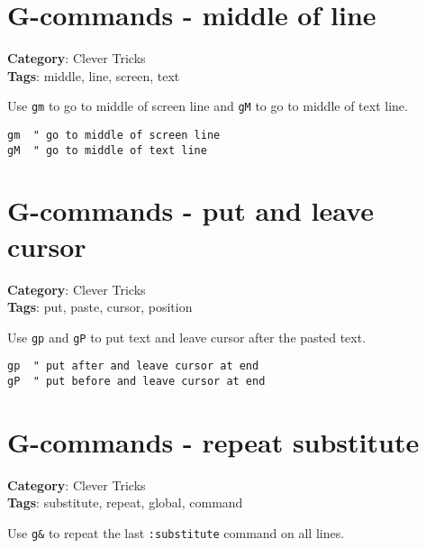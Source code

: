 {{{\section{G-commands - middle of line}

\textbf{Category}: Clever Tricks\\ \textbf{Tags}: middle, line, screen, text
\vspace{0.5cm}

Use {\footnotesize \Verb§gm§} to go to middle of screen line and {\footnotesize \Verb§gM§} to go to middle of text line.

\begin{Exa*}{}
\begin{Verbatim}[fontsize=\footnotesize, breaklines, breakanywhere]
gm  " go to middle of screen line
gM  " go to middle of text line
\end{Verbatim}
\end{Exa*}

\section{G-commands - put and leave cursor}

\textbf{Category}: Clever Tricks\\ \textbf{Tags}: put, paste, cursor, position
\vspace{0.5cm}

Use {\footnotesize \Verb§gp§} and {\footnotesize \Verb§gP§} to put text and leave cursor after the pasted text.

\begin{Exa*}{}
\begin{Verbatim}[fontsize=\footnotesize, breaklines, breakanywhere]
gp  " put after and leave cursor at end
gP  " put before and leave cursor at end
\end{Verbatim}
\end{Exa*}

\section{G-commands - repeat substitute}

\textbf{Category}: Clever Tricks\\ \textbf{Tags}: substitute, repeat, global, command
\vspace{0.5cm}

Use {\footnotesize \Verb§g&§} to repeat the last {\footnotesize \Verb§:substitute§} command on all lines.

}}}
